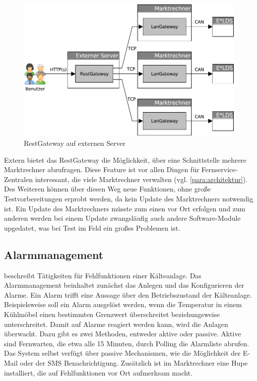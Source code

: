 \documentclass[11pt,a4paper]{report}
\begin{document}
\begin{figure}[htbp]
\centering
\includegraphics[scale=0.7]{images/RestGateway_extern.pdf}
\caption[]{RestGateway auf externen Server}
\label{fig:rest_extern}
\end{figure}

Extern bietet das RestGateway die Möglichkeit, über eine Schnittstelle mehrere Marktrechner abzufragen. Diese Feature ist vor allen Dingen für Fernservice-Zentralen interessant, die viele Marktrechner verwalten (vgl. \ref{para:architektur}). Des Weiteren können über diesen Weg neue Funktionen, ohne große Testvorbereitungen erprobt werden, da kein Update des Marktrechners notwendig ist. Ein Update des Marktrechners müsste zum einen vor Ort erfolgen und zum anderen werden bei einem Update zwangsläufig auch andere Software-Module upgedatet, was bei Test im Feld ein großes Problemen ist.

\subsection{Alarmmanagement} beschreibt Tätigkeiten für Fehlfunktionen einer Kälteanlage. Das Alarmmanagement beinhaltet zunächst das Anlegen und das Konfigurieren der Alarme. Ein Alarm trifft eine Aussage über den Betriebszustand der Kälteanlage. Beispielsweise soll ein Alarm ausgelöst werden, wenn die Temperatur in einem Kühlmöbel einen bestimmten Grenzwert überschreitet beziehungsweise unterschreitet. Damit auf Alarme reagiert werden kann, wird die Anlagen überwacht. Dazu gibt es zwei Methoden, entweder aktive oder passive. Aktive sind Fernwarten, die etwa alle 15 Minuten, durch Polling die Alarmliste abrufen. Das System selbst verfügt über passive Mechanismen, wie die Möglichkeit der E-Mail oder der SMS Benachrichtigung. Zusätzlich ist im Marktrechner eine Hupe installiert, die auf Fehlfunktionen vor Ort aufmerksam macht. 
\end{document}
